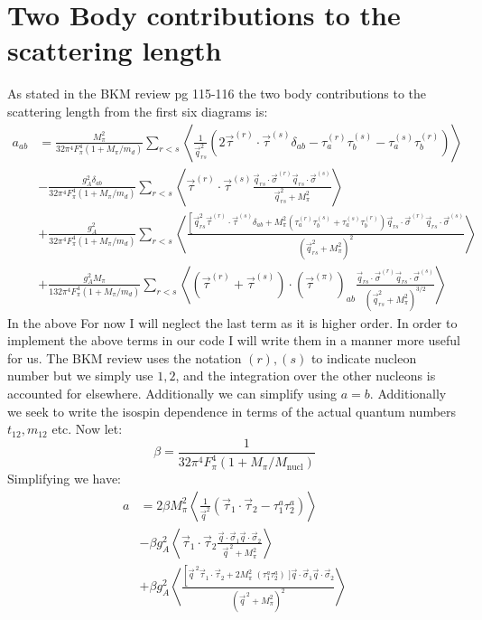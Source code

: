 \documentclass[11pt]{article}
\newcommand{\sq}{^{\,2}}
\begin{document}
\section{Two Body contributions to the scattering length}
As stated in the BKM review pg 115-116 the two body contributions to the scattering length from the first six diagrams is:
\begin{align}
    a_{ab}&= \frac{M_\pi^2}{32 \pi^4 F_\pi^4\left(1+M_\pi / m_d\right)} \sum_{r<s}\left\langle\frac{1}{\vec{q}_{r s}^2}\left(2 \vec{\tau}^{(r)} \cdot \vec{\tau}^{(s)} \delta_{a b}-\tau_a^{(r)} \tau_b^{(s)}-\tau_a^{(s)} \tau_b^{(r)}\right)\right\rangle\\
          & -\frac{g_A^2 \delta_{a b}}{32 \pi^4 F_\pi^4\left(1+M_\pi / m_d\right)} \sum_{r<s}\left\langle\vec{\tau}^{(r)} \cdot \vec{\tau}^{(s)} \frac{\vec{q}_{r s} \cdot \vec{\sigma}^{(r)} \vec{q}_{r s} \cdot \vec{\sigma}^{(s)}}{\vec{q}_{r s}^2+M_\pi^2}\right\rangle \\
          &+\frac{g_A^2}{32 \pi^4 F_\pi^4\left(1+M_\pi / m_d\right)} \sum_{r<s}\left\langle\frac{\left[\vec{q}_{r s}^2 \vec{\tau}^{(r)} \cdot \vec{\tau}^{(s)} \delta_{a b}+M_\pi^2\left(\tau_a^{(r)} \tau_b^{(s)}+\tau_a^{(s)} \tau_b^{(r)}\right) \vec{q}_{r s} \cdot \vec{\sigma}^{(r)} \vec{q}_{r s} \cdot \vec{\sigma}^{(s)}\right.}{\left(\vec{q}_{r s}^2+M_\pi^2\right)^2}\right\rangle \\
          &+\frac{g_A^2 M_\pi}{132 \pi^4 F_\pi^4\left(1+M_\pi / m_d\right)} \sum_{r<s}\left\langle\left(\vec{\tau}^{(r)}+\vec{\tau}^{(s)}\right) \cdot\left(\vec{\tau}^{(\pi)}\right)_{a b} \frac{\vec{q}_{r s} \cdot \vec{\sigma}^{(r)} \vec{q}_{r s} \cdot \vec{\sigma}^{(s)}}{\left(\vec{q}_{r s}^2+M_\pi^2\right)^{3 / 2}}\right\rangle
\end{align}
In the above 
For now I will neglect the last term as it is higher order. In order to implement the above terms in our code I will write them in a manner more useful for us.
The BKM review uses the notation $(r), (s)$ to indicate nucleon number but we simply use $1,2$, and the integration over the other nucleons is accounted for elsewhere.
Additionally we can simplify using $a=b$.
Additionally we seek to write the isospin dependence in terms of the actual quantum numbers $t_{12}, m_{12}$ etc.
Now let:
\begin{equation}
    \beta= \frac{1}{32 \pi^4 F_\pi^4 (1+M_\pi/M_{\text{nucl}})} 
\end{equation}
Simplifying we have:
\begin{align}
    a&= 2 \beta M_\pi^2\left\langle\frac{1}{\vec{q}^2}\left(\vec{\tau}_1 \cdot \vec{\tau}_2 -\tau^a_{1} \tau^a_{2}\right)\right\rangle\nonumber\\
     &-\beta g_A^2 \left\langle\vec{\tau}_{1} \cdot \vec{\tau}_{2} \frac{\vec{q} \cdot \vec{\sigma}_{1} \vec{q} \cdot \vec{\sigma}_{2}}{\vec{q}\sq+M_\pi^2}\right\rangle \\
     &+\beta g_A^2\left\langle\frac{\left[\vec{q}\sq \vec{\tau}_1 \cdot \vec{\tau}_2 +2 M_\pi^2\;\left(\tau^a_{1} \tau^a_{2}\right)\; ]\vec{q} \cdot \vec{\sigma}_{1} \vec{q}\cdot \vec{\sigma}_{2}\right.}{\left(\vec{q}\sq+M_\pi^2\right)^2}\right\rangle\nonumber
\end{align}
\end{document}
